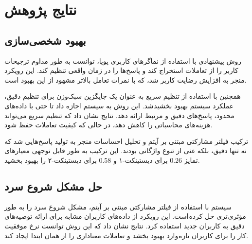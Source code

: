 \section{نتایج پژوهش}

\subsection{بهبود شخصی‌سازی}

روش پیشنهادی با استفاده از نماگر‌های کاربری پویا، توانست به طور مداوم ترجیحات کاربر را از تعاملات استخراج کند و پاسخ‌ها را در زمان واقعی تنظیم کند. این رویکرد منجر به افزایش رضایت کاربر شد، که با نمرات تعامل بالاتر مشهود از این بهبود است.

همچنین با استفاده از تنظیم سریع به عنوان یک جایگزین سبک‌وزن برای تنظیم دقیق، عملکرد سیستم بهبود بخشید شد. این روش به سیستم اجازه داد تا حتی با داده‌های محدود، پاسخ‌های دقیق و مرتبط ارائه دهد. نتایج نشان داد که تنظیم سریع می‌تواند هزینه‌های محاسباتی را کاهش دهد، در حالی که کیفیت تعاملات حفظ شود.


ترکیب فیلتر مشارکتی مبتنی بر آیتم و تحلیل احساسات منجر به تولید پاسخ‌هایی شد که نه تنها دقیق، بلکه غنی از تنوع واژگانی بودند. این ترکیب به طور قابل توجهی معیارهای تمایز
\num{0.26}
برای دیستینکت-۱ و 
\num{0.58}
 برای دیستینکت-۲ را بهبود بخشید.

\subsection{حل مشکل شروع سرد}

سیستم با استفاده از فیلتر مشارکتی مبتنی بر آیتم، مشکل شروع سرد را به طور مؤثری تری حل کرده است. این رویکرد از داده‌های کاربران مشابه برای ارائه توصیه‌های دقیق به کاربران جدید استفاده کرد. نتایج نشان داد که این روش توانست نرخ موفقیت کار را برای کاربران تازه وارد بهبود بخشد و تعاملات معناداری را از همان ابتدا ایجاد کند.

